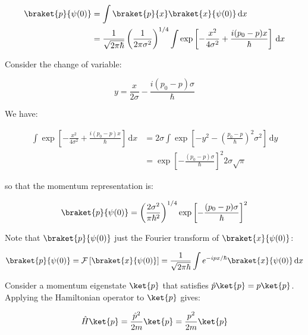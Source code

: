 \documentclass[12pt]{article}
\begin{document}
\begin{equation}
\begin{split}
    \braket{p}{\psi(0)} &= \int \braket{p}{x} \braket{x}{\psi(0)} \, \mathrm{d}x \\
    &= \frac{1}{\sqrt{2\pi\hbar}} \left( \frac{1}{2\pi \sigma^{2}} \right)^{1/4} \int \exp \left[ -\frac{x^{2}}{4\sigma^{2}} + \frac{i(p_{0} - p)x}{\hbar} \right] \, \mathrm{d}x \\
\end{split}
\end{equation}

Consider the change of variable:

\begin{equation}
    y = \frac{x}{2\sigma} - \frac{i(p_{0} - p)\sigma}{\hbar}
\end{equation}

We have:

\begin{equation}
\begin{split}
    \int \exp \left[ -\frac{x^{2}}{4\sigma^{2}} + \frac{i(p_{0} - p)x}{\hbar} \right] \, \mathrm{d}x &= 2\sigma \int \exp \left[ -y^{2} - \left( \frac{p_{0} - p}{\hbar} \right)^{2} \sigma^{2} \right] \, \mathrm{d}y \\
    &= \exp \left[ -\frac{(p_{0} - p)\sigma}{\hbar} \right]^{2} 2\sigma \sqrt{\pi}
\end{split}
\end{equation}

so that the momentum representation is:

\begin{equation}
    \braket{p}{\psi(0)} = \left( \frac{2\sigma^{2}}{\pi \hbar^{2}} \right)^{1/4} \exp \left[ -\frac{(p_{0} - p)\sigma}{\hbar} \right]^{2}
\end{equation}

Note that $\braket{p}{\psi(0)}$ just the Fourier transform of $\braket{x}{\psi(0)}$:

\begin{equation}
    \braket{p}{\psi(0)} = \mathcal{F} \left[ \braket{x}{\psi(0)} \right] = \frac{1}{\sqrt{2\pi\hbar}} \int e^{-ipx/\hbar} \braket{x}{\psi(0)} \, \mathrm{d}x
\end{equation}

Consider a momentum eigenstate $\ket{p}$ that satisfies $\hat{p} \ket{p} = p \ket{p}$. Applying the Hamiltonian operator to $\ket{p}$ gives:

\begin{equation}
    \hat{H} \ket{p} = \frac{\hat{p}^{2}}{2m} \ket{p} = \frac{p^{2}}{2m} \ket{p}
\end{equation}
\end{document}

